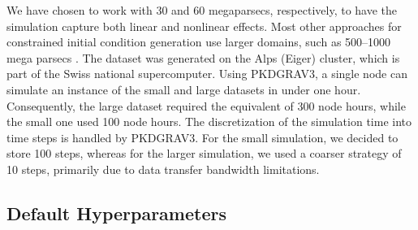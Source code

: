 \documentclass{article}
\begin{document}
We have chosen to work with 30 and 60 megaparsecs, respectively, to have the simulation capture both linear and nonlinear effects. Most other approaches for constrained initial condition generation use larger domains, such as 500–1000 mega parsecs \citep{jasche2013bayesian, kitaura2013initial}. The dataset was generated on the Alps (Eiger) cluster, which is part of the Swiss national supercomputer. Using PKDGRAV3, a single node can simulate an instance of the small and large datasets in under one hour. Consequently, the large dataset required the equivalent of 300 node hours, while the small one used 100 node hours. The discretization  of the simulation time into time steps is handled by PKDGRAV3. For the small simulation, we decided to store 100 steps, whereas for the larger simulation, we used a coarser strategy of 10 steps, primarily due to data transfer bandwidth limitations.


\subsection{Default Hyperparameters}
\end{document}
